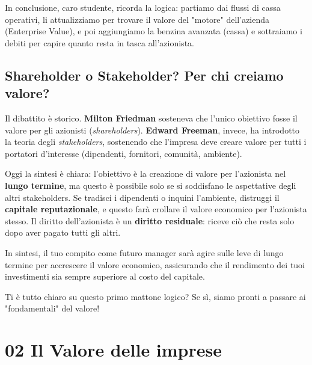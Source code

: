 \documentclass[a4paper,10pt]{article}
\begin{document}
In conclusione, caro studente, ricorda la logica: partiamo dai flussi di cassa operativi, li attualizziamo per trovare il valore del "motore" dell'azienda (Enterprise Value), e poi aggiungiamo la benzina avanzata (cassa) e sottraiamo i debiti per capire quanto resta in tasca all'azionista. 



\subsection*{Shareholder o Stakeholder? Per chi creiamo valore?}

Il dibattito è storico. \textbf{Milton Friedman} sosteneva che l'unico obiettivo fosse il valore per gli azionisti (\textit{shareholders}). \textbf{Edward Freeman}, invece, ha introdotto la teoria degli \textit{stakeholders}, sostenendo che l'impresa deve creare valore per tutti i portatori d'interesse (dipendenti, fornitori, comunità, ambiente).

Oggi la sintesi è chiara: l'obiettivo è la creazione di valore per l'azionista nel \textbf{lungo termine}, ma questo è possibile solo se si soddisfano le aspettative degli altri stakeholders. Se tradisci i dipendenti o inquini l'ambiente, distruggi il \textbf{capitale reputazionale}, e questo farà crollare il valore economico per l'azionista stesso. Il diritto dell'azionista è un \textbf{diritto residuale}: riceve ciò che resta solo dopo aver pagato tutti gli altri.

In sintesi, il tuo compito come futuro manager sarà agire sulle leve di lungo termine per accrescere il valore economico, assicurando che il rendimento dei tuoi investimenti sia sempre superiore al costo del capitale.

Ti è tutto chiaro su questo primo mattone logico? Se sì, siamo pronti a passare ai "fondamentali" del valore!
\section*{02 Il Valore delle imprese}
\end{document}
